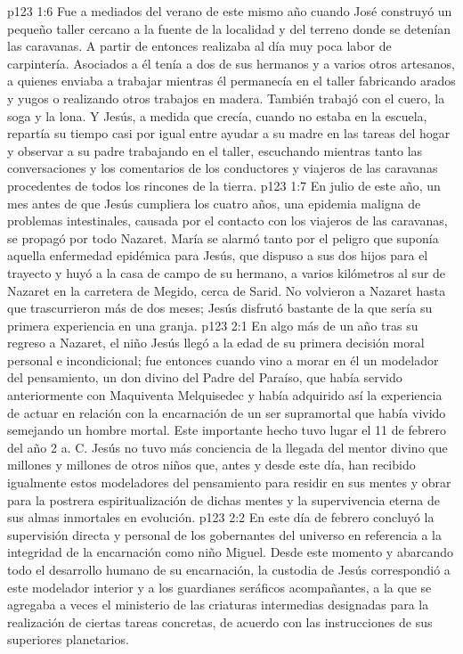 \vs p123 1:6 Fue a mediados del verano de este mismo año cuando José construyó un pequeño taller cercano a la fuente de la localidad y del terreno donde se detenían las caravanas. A partir de entonces realizaba al día muy poca labor de carpintería. Asociados a él tenía a dos de sus hermanos y a varios otros artesanos, a quienes enviaba a trabajar mientras él permanecía en el taller fabricando arados y yugos o realizando otros trabajos en madera. También trabajó con el cuero, la soga y la lona. Y Jesús, a medida que crecía, cuando no estaba en la escuela, repartía su tiempo casi por igual entre ayudar a su madre en las tareas del hogar y observar a su padre trabajando en el taller, escuchando mientras tanto las conversaciones y los comentarios de los conductores y viajeros de las caravanas procedentes de todos los rincones de la tierra.
\vs p123 1:7 En julio de este año, un mes antes de que Jesús cumpliera los cuatro años, una epidemia maligna de problemas intestinales, causada por el contacto con los viajeros de las caravanas, se propagó por todo Nazaret. María se alarmó tanto por el peligro que suponía aquella enfermedad epidémica para Jesús, que dispuso a sus dos hijos para el trayecto y huyó a la casa de campo de su hermano, a varios kilómetros al sur de Nazaret en la carretera de Megido, cerca de Sarid. No volvieron a Nazaret hasta que trascurrieron más de dos meses; Jesús disfrutó bastante de la que sería su primera experiencia en una granja.
\vs p123 2:1 En algo más de un año tras su regreso a Nazaret, el niño Jesús llegó a la edad de su primera decisión moral personal e incondicional; fue entonces cuando vino a morar en él un modelador del pensamiento, un don divino del Padre del Paraíso, que había servido anteriormente con Maquiventa Melquisedec y había adquirido así la experiencia de actuar en relación con la encarnación de un ser supramortal que había vivido semejando un hombre mortal. Este importante hecho tuvo lugar el 11 de febrero del año 2 a. C. Jesús no tuvo más conciencia de la llegada del mentor divino que millones y millones de otros niños que, antes y desde este día, han recibido igualmente estos modeladores del pensamiento para residir en sus mentes y obrar para la postrera espiritualización de dichas mentes y la supervivencia eterna de sus almas inmortales en evolución.
\vs p123 2:2 En este día de febrero concluyó la supervisión directa y personal de los gobernantes del universo en referencia a la integridad de la encarnación como niño Miguel. Desde este momento y abarcando todo el desarrollo humano de su encarnación, la custodia de Jesús correspondió a este modelador interior y a los guardianes seráficos acompañantes, a la que se agregaba a veces el ministerio de las criaturas intermedias designadas para la realización de ciertas tareas concretas, de acuerdo con las instrucciones de sus superiores planetarios.
